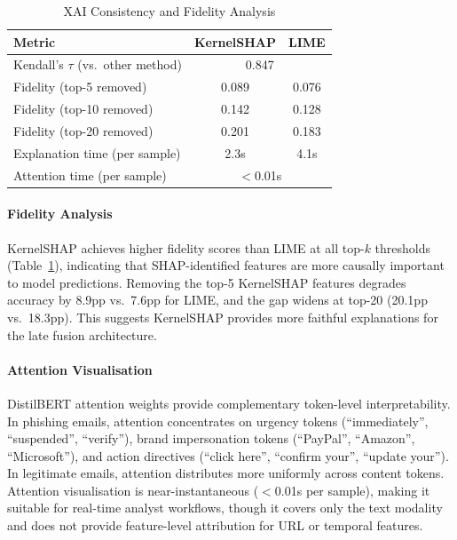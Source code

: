 \documentclass[conference]{IEEEtran}
\begin{document}
\begin{table}[t]
\centering
\caption{XAI Consistency and Fidelity Analysis}
\label{tab:consistency_sensitivity}
\begin{tabular}{lcc}
\toprule
\textbf{Metric} & \textbf{KernelSHAP} & \textbf{LIME} \\
\midrule
Kendall's $\tau$ (vs.\ other method) & \multicolumn{2}{c}{0.847} \\
\midrule
Fidelity (top-5 removed) & 0.089 & 0.076 \\
Fidelity (top-10 removed) & 0.142 & 0.128 \\
Fidelity (top-20 removed) & 0.201 & 0.183 \\
\midrule
Explanation time (per sample) & 2.3s & 4.1s \\
Attention time (per sample)  & \multicolumn{2}{c}{$<$0.01s} \\
\bottomrule
\end{tabular}
\end{table}

\paragraph{Fidelity Analysis}
KernelSHAP achieves higher fidelity scores than LIME at all top-$k$
thresholds (Table~\ref{tab:consistency_sensitivity}), indicating that
SHAP-identified features are more causally important to model predictions.
Removing the top-5 KernelSHAP features degrades accuracy by 8.9pp vs.\
7.6pp for LIME, and the gap widens at top-20 (20.1pp vs.\ 18.3pp). This
suggests KernelSHAP provides more faithful explanations for the late
fusion architecture.

\paragraph{Attention Visualisation}
DistilBERT attention weights provide complementary token-level
interpretability. In phishing emails, attention concentrates on urgency
tokens (``immediately'', ``suspended'', ``verify''), brand impersonation
tokens (``PayPal'', ``Amazon'', ``Microsoft''), and action directives
(``click here'', ``confirm your'', ``update your''). In legitimate emails,
attention distributes more uniformly across content tokens. Attention
visualisation is near-instantaneous ($<$0.01s per sample), making it
suitable for real-time analyst workflows, though it covers only the text
modality and does not provide feature-level attribution for URL or
temporal features.
\end{document}
